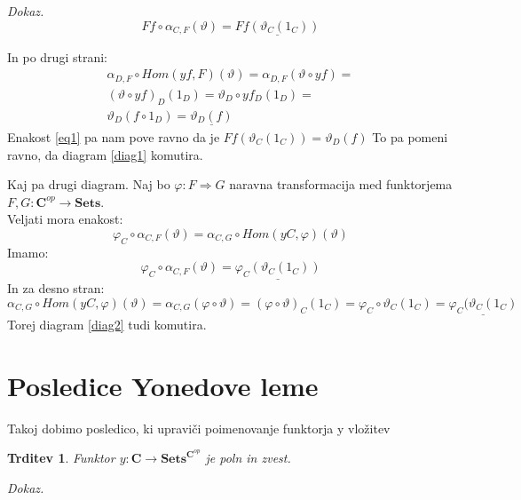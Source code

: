 \documentclass[12pt,a4paper]{book}
\theoremstyle{definition}
\theoremstyle{plain}
\newtheorem{trditev}{Trditev}[izrek]
\newenvironment{dokaz}{\emph{Dokaz.}\ }{\hspace{\fill}{$\Box$}}
\theoremstyle{definition}
\theoremstyle{remark}
\newcommand{\cat}[1]{\textbf{#1}}
\begin{document}
\begin{dokaz}
$$Ff \circ \alpha_{C,F}(\vartheta) = \underline{Ff(\vartheta_C(1_C))}$$

In po drugi strani:
\begin{align*}
\alpha_{D,F} \circ Hom(yf,F)(\vartheta) = \alpha_{D,F}(\vartheta \circ yf) = \\
(\vartheta \circ yf)_D (1_D) = \vartheta_D \circ yf_D(1_D) = \\
\vartheta_D(f \circ 1_D) = \underline{\vartheta_D(f)}
\end{align*}
Enakost \ref{eq1} pa nam pove ravno da je $Ff(\vartheta_C(1_C)) = \vartheta_D(f)$
To pa pomeni ravno, da diagram \ref{diag1} komutira.

Kaj pa drugi diagram. Naj bo $\varphi : F \Rightarrow G$ naravna transformacija med funktorjema $F,G : \cat{C}^{op} \to \cat{Sets}$. \\
Veljati mora enakost:
$$\varphi_C \circ \alpha_{C,F}(\vartheta) = \alpha_{C,G} \circ Hom(yC,\varphi)(\vartheta)$$
Imamo:
$$\varphi_C \circ \alpha_{C,F}(\vartheta) = \underline{\varphi_C(\vartheta_C(1_C))}$$
In za desno stran:
$$\alpha_{C,G} \circ Hom(yC,\varphi)(\vartheta) = \alpha_{C,G}(\varphi \circ \vartheta) = 
(\varphi \circ \vartheta)_C(1_C) = \varphi_C \circ \vartheta_C(1_C) = \underline{\varphi_C(\vartheta_C(1_C)}$$
Torej diagram \ref{diag2} tudi komutira.

\end{dokaz}

\section{Posledice Yonedove leme}

Takoj dobimo posledico, ki upraviči poimenovanje funktorja y vložitev
\begin{trditev} Funktor $y : \cat{C} \to \cat{Sets}^{\cat{C}^{op}}$ je poln in zvest.
\end{trditev}
\begin{dokaz}

\end{dokaz}
\end{document}
